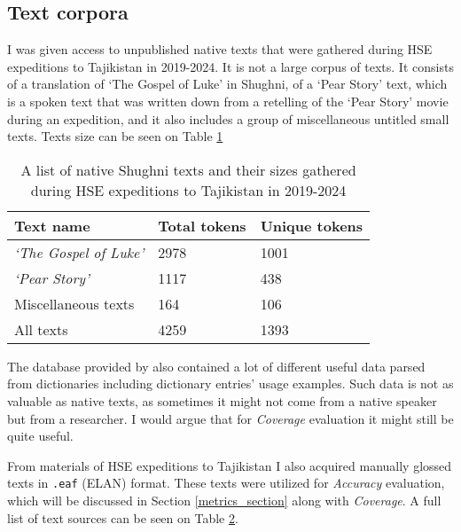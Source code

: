 \subsection{Text corpora}
I was given access to unpublished native texts that were gathered during HSE expeditions to Tajikistan in 2019-2024. It is not a large corpus of texts. It consists of a translation of `The Gospel of Luke' in Shughni, of a `Pear Story' text, which is a spoken text that was written down from a retelling of the `Pear Story' movie during an expedition, and it also includes a group of miscellaneous untitled small texts. Texts size can be seen on Table \hyperref[Tab:native_texts]{1}

\begin{table}[!h]
    \begin{center}
        \begin{tabular}{|l|l|l|}
            \hline
            \textbf{Text name} & \textbf{Total tokens} & \textbf{Unique tokens} \\
            \hline
            \textit{`The Gospel of Luke'} & 2978 & 1001 \\
            \textit{`Pear Story'} & 1117 & 438 \\
            Miscellaneous texts & 164 & 106 \\
            \hline
            All texts & 4259 & 1393 \\
            \hline
        \end{tabular}
        \caption{A list of native Shughni texts and their sizes gathered during HSE expeditions to Tajikistan in 2019-2024}
        \label{Tab:native_texts}
    \end{center}
\end{table}

The database provided by \textcite{makarov_digital_2022} also contained a lot of different useful data parsed from dictionaries including dictionary entries' usage examples. Such data is not as valuable as native texts, as sometimes it might not come from a native speaker but from a researcher. I would argue that for \textit{Coverage} evaluation it might still be quite useful. 

From materials of HSE expeditions to Tajikistan I also acquired manually glossed texts in \texttt{.eaf} (ELAN) format. These texts were utilized for \textit{Accuracy} evaluation, which will be discussed in Section \ref{metrics_section} along with \textit{Coverage}. A full list of text sources can be seen on Table \hyperref[Tab:all_texts]{2}.

